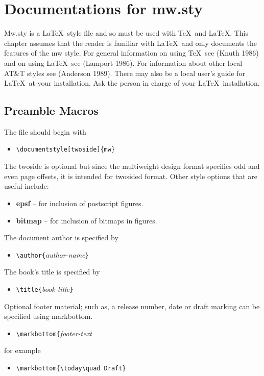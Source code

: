 \chapter{Documentations for mw.sty\label{chap:doc}}
Mw.sty is a \LaTeX\ style file and so must be used with \TeX\ and
\LaTeX .  This chapter assumes that the reader is familiar with
\LaTeX\ and only documents the features of the mw style.  For general
information on using \TeX\ see (Knuth 1986) and on using \LaTeX\ see
(Lamport 1986).  For information about other local AT\&T styles see
(Anderson 1989).  There may also be a local user's guide for \LaTeX\
at your installation.  Ask the person in charge of your \LaTeX\
installation. 

\section{Preamble Macros}
The file should begin with 
\begin{itemize}
  \item[]
  \verb|\documentstyle[twoside]{mw}|
\end{itemize}
The twoside is optional but since the multiweight design format
specifies odd and even page offsets, it is intended for twosided
format.  Other style options that are useful include:
\begin{itemize}
  \item{\bf epsf} -- for inclusion of postscript figures.
  \item{\bf bitmap} -- for inclusion of bitmaps in figures. 
\end{itemize}

The document author is specified by
\begin{itemize}
  \item[]\verb|\author{|{\it author-name}\verb|} |
\end{itemize}

The book's title is specified by 
\begin{itemize}
  \item[]\verb|\title{|{\it book-title}\verb|}|
\end{itemize}

Optional footer material; such as, a release number, date or draft
marking can be specified using markbottom.
\begin{itemize}
  \item[]\verb|\markbottom{|{\it footer-text}\verb|| 
\end{itemize}
for example
\begin{itemize}
  \item[]\verb|\markbottom{\today\quad Draft}| 
\end{itemize}

